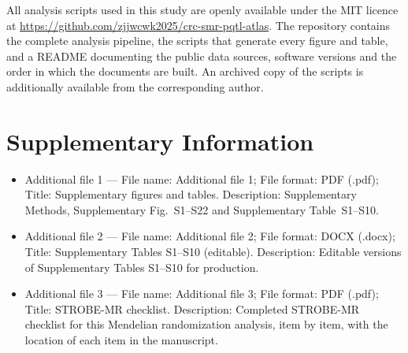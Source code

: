 \documentclass[11pt,a4paper]{article}
\begin{document}
All analysis scripts used in this study are openly available under the MIT
licence at \url{https://github.com/zjjwcwk2025/crc-smr-pqtl-atlas}. The repository
contains the complete analysis pipeline, the scripts that generate every figure
and table, and a README documenting the public data sources, software versions and
the order in which the documents are built. An archived copy of the scripts is
additionally available from the corresponding author.

\section*{Supplementary Information}

\begin{itemize}
\item Additional file 1 --- File name: Additional file 1; File format: PDF (.pdf);
Title: Supplementary figures and tables. Description: Supplementary Methods,
Supplementary Fig.~S1--S22 and Supplementary Table~S1--S10.
\item Additional file 2 --- File name: Additional file 2; File format: DOCX (.docx);
Title: Supplementary Tables S1--S10 (editable). Description: Editable versions of
Supplementary Tables S1--S10 for production.
\item Additional file 3 --- File name: Additional file 3; File format: PDF (.pdf);
Title: STROBE-MR checklist. Description: Completed STROBE-MR checklist for this
Mendelian randomization analysis, item by item, with the location of each item in
the manuscript.
\end{itemize}
\end{document}
